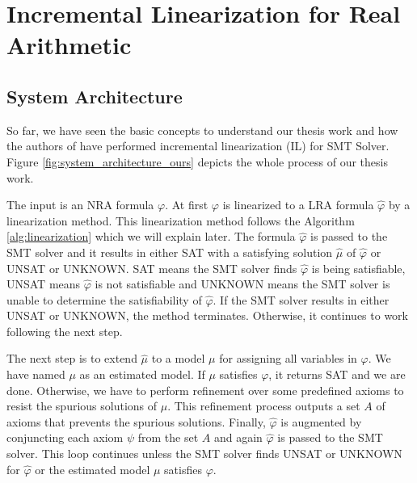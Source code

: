 \chapter{Incremental Linearization for Real Arithmetic}
\label{chap:Incremental_Linearization_For_Real_Arithmetic}

\section{System Architecture}
\label{sec:system_architecture}
So far, we have seen the basic concepts to understand our thesis work and how the authors of \cite{Cimatti:2018:ILS:3274693.3230639} have performed incremental linearization (IL) for SMT Solver.
Figure \ref{fig:system_architecture_ours} depicts the whole process of our thesis work.\newline

\noindent The input is an NRA formula $\varphi$.
At first $\varphi$ is linearized to a LRA formula $\hat{\varphi}$ by a linearization method.
This linearization method follows the Algorithm \ref{alg:linearization} which we will explain later.
The formula $\hat{\varphi}$ is passed to the SMT solver and it results in either SAT with a satisfying solution $\hat{\mu}$ of $\hat{\varphi}$ or UNSAT or UNKNOWN.
SAT means the SMT solver finds $\hat{\varphi}$ is being satisfiable, UNSAT means $\hat{\varphi}$ is not satisfiable and UNKNOWN means the SMT solver is unable to determine the satisfiability  of $\hat{\varphi}$.
If the SMT solver results in either UNSAT or UNKNOWN, the method terminates.
Otherwise, it continues to work following the next step.\newline

\noindent The next step is to extend $\hat{\mu}$ to a model $\mu$ for assigning all variables in $\varphi$.
We have named $\mu$ as an estimated model.
If $\mu$ satisfies $\varphi$, it returns SAT and we are done.
Otherwise, we have to perform refinement over some predefined axioms to resist the spurious solutions of $\mu$.
This refinement process outputs a set $A$ of axioms that prevents the spurious solutions.
Finally, $\hat{\varphi}$ is augmented by conjuncting each axiom $\psi$ from the set $A$ and again $\hat{\varphi}$ is passed to the SMT solver.
This loop continues unless the SMT solver finds UNSAT or UNKNOWN for $\hat{\varphi}$ or the estimated model $\mu$ satisfies $\varphi$.\newline

